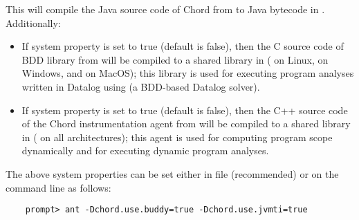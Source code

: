 \noindent This will compile
the Java source code of Chord from  to Java bytecode
in .
Additionally:
\begin{itemize}
\item
If system property  is set to true (default is false),
then the C source code of BDD library
 from
 will be compiled to a shared library in 
( on Linux,  on Windows, and
 on MacOS); this library is used for executing
program analyses written in Datalog using
 (a
BDD-based Datalog solver).
\item
If system property  is set to true (default is false),
then the C++ source code of the Chord instrumentation agent from
 will be compiled to a shared library in 
( on all architectures); this agent is
used for computing program scope dynamically and for executing
dynamic program analyses.
\end{itemize}
The above system properties can be set either in file 
(recommended) or on the command line as follows:

\begin{verbatim}
    prompt> ant -Dchord.use.buddy=true -Dchord.use.jvmti=true
\end{verbatim}

